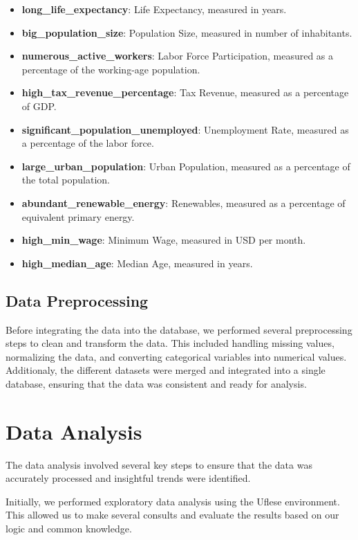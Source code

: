 \documentclass[fleqn,11pt]{article}
\begin{document}
\begin{itemize}
    \item \textbf{long\_life\_expectancy}: Life Expectancy, measured in years.
    \item \textbf{big\_population\_size}: Population Size, measured in number of inhabitants.
    \item \textbf{numerous\_active\_workers}: Labor Force Participation, measured as a percentage of the working-age population.
    \item \textbf{high\_tax\_revenue\_percentage}: Tax Revenue, measured as a percentage of GDP.
    \item \textbf{significant\_population\_unemployed}: Unemployment Rate, measured as a percentage of the labor force.
    \item \textbf{large\_urban\_population}: Urban Population, measured as a percentage of the total population.
    \item \textbf{abundant\_renewable\_energy}: Renewables, measured as a percentage of equivalent primary energy.
    \item \textbf{high\_min\_wage}: Minimum Wage, measured in USD per month.
    \item \textbf{high\_median\_age}: Median Age, measured in years.
\end{itemize}

\subsection{Data Preprocessing}
Before integrating the data into the database, we performed several preprocessing steps to clean and transform the data.
This included handling missing values, normalizing the data, and converting categorical variables into numerical values.
Additionaly, the different datasets were merged and integrated into a single database, ensuring that the data was consistent and ready for analysis.

\section{Data Analysis}

The data analysis involved several key steps to ensure that the data was accurately processed and insightful trends were identified.

Initially, we performed exploratory data analysis using the Uflese environment. This allowed us to make several consults and evaluate the results based on our logic and common knowledge. 
\end{document}
